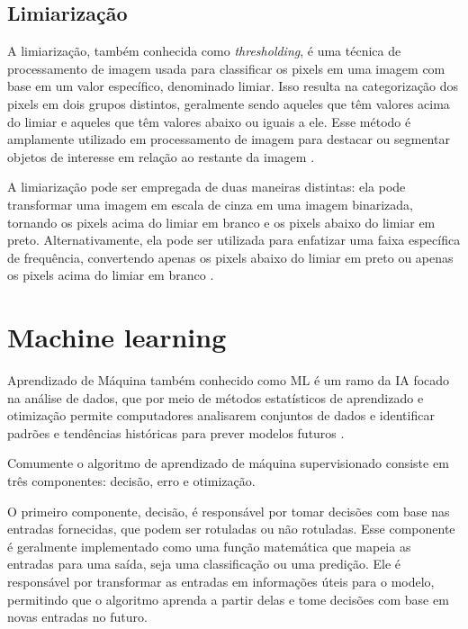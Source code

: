 \subsection[Limiarização]{Limiarização}

A limiarização, também conhecida como \textit{thresholding}, é uma técnica de processamento de imagem usada para classificar os pixels em uma imagem com base em um valor específico, denominado limiar. Isso resulta na categorização dos pixels em dois grupos distintos, geralmente sendo aqueles que têm valores acima do limiar e aqueles que têm valores abaixo ou iguais a ele. Esse método é amplamente utilizado em processamento de imagem para destacar ou segmentar objetos de interesse em relação ao restante da imagem \cite{limiarizacao}.

A limiarização pode ser empregada de duas maneiras distintas: ela pode transformar uma imagem em escala de cinza em uma imagem binarizada, tornando os pixels acima do limiar em branco e os pixels abaixo do limiar em preto. Alternativamente, ela pode ser utilizada para enfatizar uma faixa específica de frequência, convertendo apenas os pixels abaixo do limiar em preto ou apenas os pixels acima do limiar em branco \cite{opencv_thresholding}.


\section[Machine learning]{Machine learning}\label{sec:Machine learning}

Aprendizado de Máquina também conhecido como \ac{ML} é um ramo da \ac{IA} focado na análise de dados, que por meio de métodos estatísticos de aprendizado e otimização  permite computadores analisarem conjuntos de dados e identificar padrões e tendências históricas para prever modelos futuros \cite{ml}.

Comumente o algoritmo de aprendizado de máquina supervisionado consiste em três componentes: decisão, erro e otimização. 

O primeiro componente, decisão, é responsável por tomar decisões com base nas entradas fornecidas, que podem ser rotuladas ou não rotuladas. Esse componente é geralmente implementado como uma função matemática que mapeia as entradas para uma saída, seja uma classificação ou uma predição. Ele é responsável por transformar as entradas em informações úteis para o modelo, permitindo que o algoritmo aprenda a partir delas e tome decisões com base em novas entradas no futuro.

